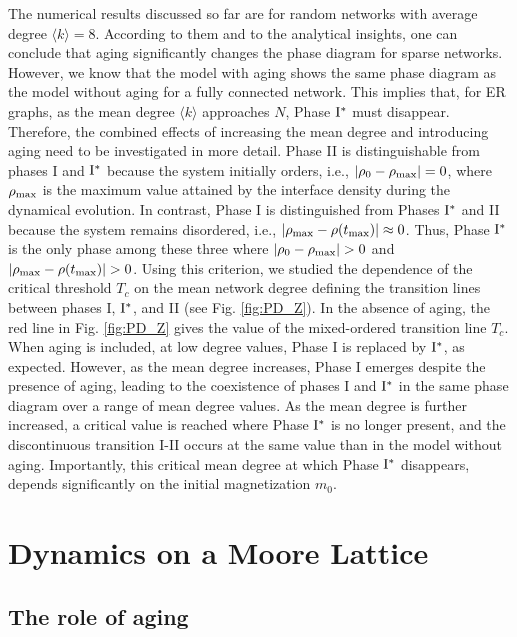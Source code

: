 The numerical results discussed so far are for random networks with average degree $\langle k \rangle = 8$. According to them and to the analytical insights, one can conclude that aging significantly changes the phase diagram for sparse networks. However, we know that the model with aging shows the same phase diagram as the model without aging for a fully connected network. This implies that, for ER graphs, as the mean degree $\langle k \rangle$ approaches $N$, Phase ${\rm I}^{*}$ must disappear. Therefore, the combined effects of increasing the mean degree and introducing aging need to be investigated in more detail. Phase II is distinguishable from phases I and ${\rm I}^{*}$ because the system initially orders, i.e., $|\rho_0 - \rho_{\rm max}| = 0$, where $\rho_{\rm max}$ is the maximum value attained by the interface density during the dynamical evolution. In contrast, Phase I is distinguished from Phases ${\rm I}^{*}$ and II because the system remains disordered, i.e., $|\rho_{\rm max} - \rho(t_{\rm max})| \approx 0$. Thus, Phase ${\rm I}^{*}$ is the only phase among these three where $|\rho_0 - \rho_{\rm max}| > 0$ and $|\rho_{\rm max} - \rho(t_{\rm max})| > 0$. Using this criterion, we studied the dependence of the critical threshold  $T_c$ on the mean network degree defining the transition lines between phases I, ${\rm I}^{*}$, and II (see Fig. \ref{fig:PD_Z}). In the absence of aging, the red line in Fig. \ref{fig:PD_Z} gives the value of the mixed-ordered transition line $T_c$. When aging is included, at low degree values, Phase I is replaced by ${\rm I}^{*}$, as expected. However, as the mean degree increases, Phase I emerges despite the presence of aging, leading to the coexistence of phases I and ${\rm I}^{*}$ in the same phase diagram over a range of mean degree values. As the mean degree is further increased, a critical value is reached where Phase ${\rm I}^{*}$ is no longer present, and the discontinuous transition I-II occurs at the same value than in the model without aging. Importantly, this critical mean degree at which Phase ${\rm I}^{*}$ disappears, depends significantly on the initial magnetization $m_0$.

\section{\label{sec: Dynamics on a Moore Lattice}  Dynamics on a Moore Lattice}

\subsection{The role of aging}

